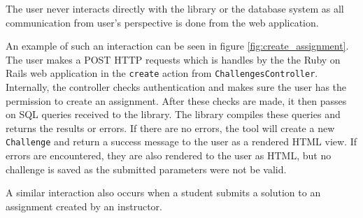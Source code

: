 The user never interacts directly with the library or the database system as all communication from user's perspective is done from the web application.

An example of such an interaction can be seen in figure \ref{fig:create_assignment}. The user makes a POST HTTP requests which is handles by the the Ruby on Rails web application in the \texttt{create} action from \texttt{ChallengesController}. Internally, the controller checks authentication and makes sure the user has the permission to create an assignment. After these checks are made, it then passes on SQL queries received to the library. The library compiles these queries and returns the results or errors. If there are no errors, the tool will create a new \texttt{Challenge} and return a success message to the user as a rendered HTML view. If errors are encountered, they are also rendered to the user as HTML, but no challenge is saved as the submitted parameters were not be valid.

A similar interaction also occurs when a student submits a solution to an assignment created by an instructor.
